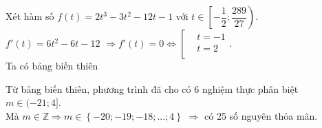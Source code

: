\begin{ex}
{		Xét hàm số $ f(t)=2t^3 -3t^2 -12t-1$ với $ t\in \left[-\dfrac{1}{2};\dfrac{289}{27}\right)$.\\
		$f'(t)=6t^2 -6t-12$ $\Rightarrow f'(t)=0\Leftrightarrow \left[ \begin{aligned}
			& t=-1 \\
			& t=2 \\
		\end{aligned} \right.$.\\
		Ta có bảng biến thiên
		\begin{center}
		\end{center}
		Từ bảng biến thiên, phương trình đã cho có 6 nghiệm thực phân biệt $ m\in ( -21;4 ]$.\\
		Mà $ m\in \mathbb{Z}\Rightarrow m\in \left\{ -20;-19;-18;...;4 \right\}$ $\Rightarrow $ có 25 số nguyên thỏa mãn.
	}
\end{ex}
